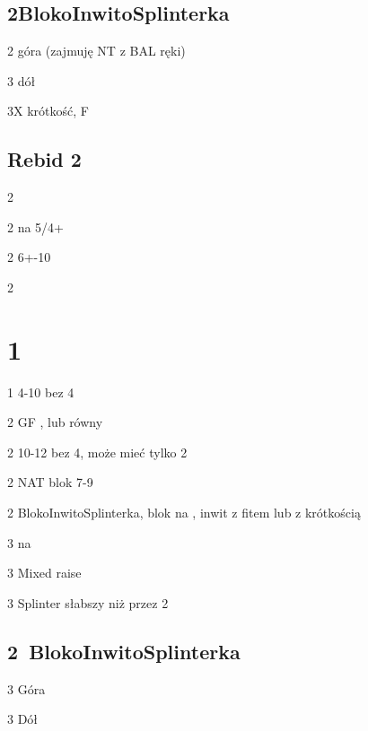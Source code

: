 \documentclass[12pt, a4paper]{article}
\begin{document}
\subsection*{2\spades BlokoInwitoSplinterka}
\sequence{{1\clubs}{2\spades}}
\begin{options}[1]
    \item[2\nt] góra (zajmuję NT z BAL ręki)
    \item[3\clubs] dół
    \item[3X] krótkość, F \clubs
\end{options}


\subsection*{Rebid 2\clubs}
\sequence{{1\clubs}{1\spades}{2\clubs}}
\begin{options}[2]
    \item[2\diams] \gf
    \item[2\hearts] \inv na 5/4+
    \item[2\spades] 6+-10
    \item[2\nt] \inv\ \nf   
\end{options}



\vspace{3cm}
\section*{1\diams}

\sequence{{1\diams}}
\begin{options}
  \item[1\nt] 4-10 bez 4\major
  \item[2\clubs] GF \clubs, \diams lub równy
  \item[2\diams] 10-12 bez 4\major, może mieć tylko 2\diams \vimp
  \item[2\major] NAT blok 7-9
  \item[2\nt] BlokoInwitoSplinterka, blok na \diams, inwit z fitem lub \gf z krótkością
  \item[3\clubs] \inv na \clubs
  \item[3\diams] Mixed raise
  \item[3\major] Splinter słabszy niż przez 2\nt     
\end{options}

\subsection*{2\ntx\ BlokoInwitoSplinterka}
\begin{options}
  \item[3\clubs] Góra
  \item[3\diams] Dół 
\end{options}
\end{document}
